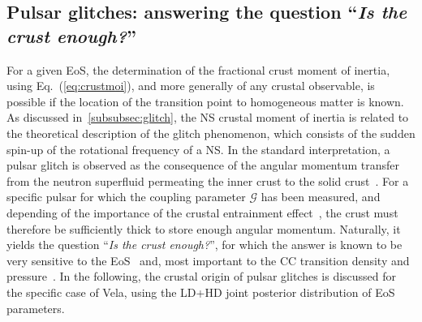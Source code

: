 \subsection{Pulsar glitches: answering the question
``\textit{Is the crust enough?}''}\label{subsec:gli_stats}

For a given EoS, the determination of the fractional crust moment of inertia,
using Eq.~(\ref{eq:crustmoi}), 
and more generally of any crustal observable, is possible if 
the location of the transition point to homogeneous matter is known.
As discussed in~\ref{subsubsec:glitch}, the NS crustal moment of inertia is
related to the theoretical description of the glitch phenomenon, which consists
of the sudden spin-up of the rotational frequency of a NS. In the standard 
interpretation, a pulsar glitch is observed as the consequence of the angular 
momentum transfer from the neutron superfluid permeating the inner crust to the 
solid crust~\cite{Anderson1975}. For a specific pulsar for which the coupling 
parameter $\mathcal{G}$ has been measured, and depending of the importance of 
the crustal entrainment effect~\cite{Chamel2013}, the crust must therefore be 
sufficiently thick to store enough angular momentum. Naturally, it yields the 
question ``\textit{Is the crust enough?}'', for which the answer is known to be 
very sensitive to the EoS~\cite{Andersson2012,Piekarewicz2014} and, most 
important to the CC transition density and pressure~\cite{Carreau2019moi}. In 
the following, the crustal origin of pulsar glitches is discussed for the 
specific case of Vela, using the LD+HD joint posterior distribution of EoS 
parameters.

